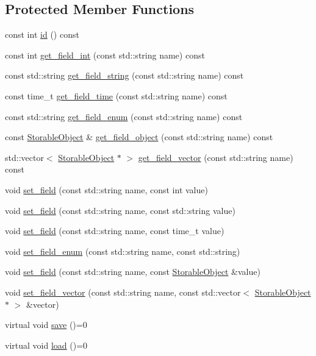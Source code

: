 \subsection*{Protected Member Functions}
\begin{DoxyCompactItemize}
\item 
const int \hyperlink{classStorage_1_1StorableObject_ae3e389b184651f78594df7f83f944a2c}{id} () const 
\item 
const int \hyperlink{classStorage_1_1StorableObject_a11a172f37f8805453225be4fa98e87ae}{get\_\-field\_\-int} (const std::string name) const 
\item 
const std::string \hyperlink{classStorage_1_1StorableObject_a533b48a050009b86e376269e886d3eeb}{get\_\-field\_\-string} (const std::string name) const 
\item 
const time\_\-t \hyperlink{classStorage_1_1StorableObject_a8c4e071ed59d2cdd5d2a00806211b4e1}{get\_\-field\_\-time} (const std::string name) const 
\item 
const std::string \hyperlink{classStorage_1_1StorableObject_abcaf10bdc0f2db297c53cbd9ca0acd4d}{get\_\-field\_\-enum} (const std::string name) const 
\item 
const \hyperlink{classStorage_1_1StorableObject}{StorableObject} \& \hyperlink{classStorage_1_1StorableObject_a1f48a3363218ebfe985149b33d072067}{get\_\-field\_\-object} (const std::string name) const 
\item 
std::vector$<$ \hyperlink{classStorage_1_1StorableObject}{StorableObject} $\ast$ $>$ \hyperlink{classStorage_1_1StorableObject_ad6df389823d8f812e4c64994d440475b}{get\_\-field\_\-vector} (const std::string name) const 
\item 
void \hyperlink{classStorage_1_1StorableObject_a4c15433a6719f4036705d989828e4933}{set\_\-field} (const std::string name, const int value)
\item 
void \hyperlink{classStorage_1_1StorableObject_a95c8d3440fa0ef6bce0f8d3bbac1f477}{set\_\-field} (const std::string name, const std::string value)
\item 
void \hyperlink{classStorage_1_1StorableObject_af16a9fb211fd421a5aa89d741a67c2fb}{set\_\-field} (const std::string name, const time\_\-t value)
\item 
void \hyperlink{classStorage_1_1StorableObject_a14764d884ae0cfc51aab3c391423f781}{set\_\-field\_\-enum} (const std::string name, const std::string)
\item 
void \hyperlink{classStorage_1_1StorableObject_a97dd82cb4f99d421e84e3bac17dc8c8b}{set\_\-field} (const std::string name, const \hyperlink{classStorage_1_1StorableObject}{StorableObject} \&value)
\item 
void \hyperlink{classStorage_1_1StorableObject_adb46898ef1cc21af62eeff54a583e8d4}{set\_\-field\_\-vector} (const std::string name, const std::vector$<$ \hyperlink{classStorage_1_1StorableObject}{StorableObject} $\ast$ $>$ \&vector)
\item 
virtual void \hyperlink{classStorage_1_1StorableObject_a85609f4a18b49c7e0eed0205ee6df5d9}{save} ()=0
\item 
virtual void \hyperlink{classStorage_1_1StorableObject_ab92526b66762a9099d720cf28bfc4151}{load} ()=0
\end{DoxyCompactItemize}
